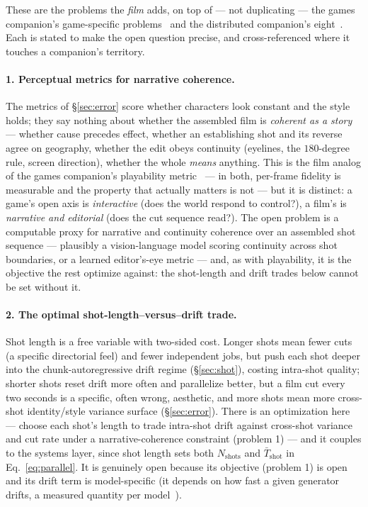 \documentclass[11pt]{article}
\newcommand{\Nshots}{\ensuremath{N_{\mathrm{shots}}}}
\newcommand{\Tshot}{\ensuremath{\bar{T}_{\mathrm{shot}}}}
\begin{document}
These are the problems the \emph{film} adds, on top of --- not duplicating --- the games companion's game-specific
problems~\cite{games} and the distributed companion's eight~\cite{openproblems}. Each is stated to make the open
question precise, and cross-referenced where it touches a companion's territory.

\paragraph{1. Perceptual metrics for narrative coherence.} The metrics of \S\ref{sec:error} score whether
characters look constant and the style holds; they say nothing about whether the assembled film is
\emph{coherent as a story} --- whether cause precedes effect, whether an establishing shot and its reverse agree
on geography, whether the edit obeys continuity (eyelines, the $180$-degree rule, screen direction), whether the
whole \emph{means} anything. This is the film analog of the games companion's playability metric~\cite{games} ---
in both, per-frame fidelity is measurable and the property that actually matters is not --- but it is distinct: a
game's open axis is \emph{interactive} (does the world respond to control?), a film's is \emph{narrative and
editorial} (does the cut sequence read?). The open problem is a computable proxy for narrative and continuity
coherence over an assembled shot sequence --- plausibly a vision-language model scoring continuity across shot
boundaries, or a learned editor's-eye metric --- and, as with playability, it is the objective the rest optimize
against: the shot-length and drift trades below cannot be set without it.

\paragraph{2. The optimal shot-length--versus--drift trade.} Shot length is a free variable with two-sided cost.
Longer shots mean fewer cuts (a specific directorial feel) and fewer independent jobs, but push each shot deeper
into the chunk-autoregressive drift regime (\S\ref{sec:shot}), costing intra-shot quality; shorter shots reset
drift more often and parallelize better, but a film cut every two seconds is a specific, often wrong, aesthetic,
and more shots mean more cross-shot identity/style variance surface (\S\ref{sec:error}). There is an optimization
here --- choose each shot's length to trade intra-shot drift against cross-shot variance and cut rate under a
narrative-coherence constraint (problem 1) --- and it couples to the systems layer, since shot length sets both
$\Nshots$ and $\Tshot$ in Eq.~\eqref{eq:parallel}. It is genuinely open because its objective (problem 1) is
open and its drift term is model-specific (it depends on how fast a given generator drifts, a measured quantity
per model~\cite{tethercache,framepack}).
\end{document}
